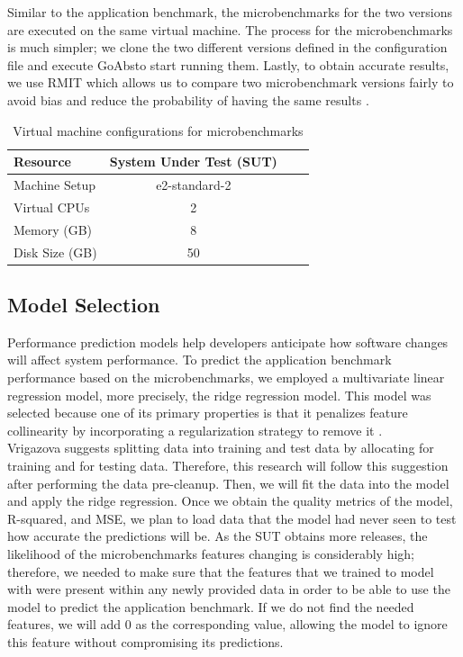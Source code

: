 Similar to the application benchmark, the microbenchmarks for the two versions are executed on the same virtual machine. The process for the microbenchmarks is much simpler; we clone the two different versions defined in the configuration file and execute \ac{GoAbs}to start running them. Lastly, to obtain accurate results, we use \ac{RMIT} which allows us to compare two microbenchmark versions fairly to avoid bias and reduce the probability of having the same results
\cite{japke2023earlymicrobenchmarkcatches}. \\
\begin{table}[ht]
    \centering
    \begin{tabular}{lccc}
        \toprule
        \textbf{Resource} & \textbf{System Under Test (SUT)} \\
        \midrule
        Machine Setup & e2-standard-2 \\
        Virtual CPUs & 2\\
        Memory (GB) & 8  \\
        Disk Size (GB) & 50 \\
        \bottomrule
    \end{tabular}
    \caption{Virtual machine configurations for microbenchmarks}
    \label{tab:vm_configurations_micro}
\end{table}

\subsection{Model Selection}
Performance prediction models help developers anticipate how software changes will affect system performance. To predict the application benchmark performance based on the microbenchmarks, we employed a multivariate linear regression model, more precisely, the ridge regression model. This model was selected because one of its primary properties is that it penalizes feature collinearity by incorporating a regularization strategy to remove it \cite{mcdonald2009ridgeregression}.  \\
Vrigazova \cite{vrigazova2021proportion} suggests splitting data into training and test data by allocating  for training and  for testing data. Therefore, this research will follow this suggestion after performing the data pre-cleanup. Then, we will fit the data into the model and apply the ridge regression. Once we obtain the quality metrics of the model, R-squared, and \ac{MSE}, we plan to load data that the model had never seen to test how accurate the predictions will be. As the \ac{SUT} obtains more releases, the likelihood of the microbenchmarks features changing is considerably high; therefore, we needed to make sure that the features that we trained to model with were present within any newly provided data in order to be able to use the model to predict the application benchmark. If we do not find the needed features, we will add 0 as the corresponding value, allowing the model to ignore this feature without compromising its predictions. 